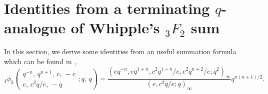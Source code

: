 \documentclass[reqno,12pt]{amsart}
\theoremstyle{remark}
\numberwithin{equation}{section}
\begin{document}
\section{Identities from a terminating $q$-analogue of Whipple's ${_3F_2}$ sum}
In this section,  we derive some identities from  an useful summation formula which can be found in \cite{Gasper_and_Rahman},
\begin{equation}\label{Whipple}
_4\phi_3\left(
\begin{array}{cccc}
q^{-n},\,q^{n+1},\,c,\,-c\\
e,\,c^2q/e,\,-q
\end{array};q,\,q\right)
=\frac{\left(eq^{-n},eq^{1+n},c^2q^{1-n}/e,c^2q^{n+2}/e;q^2\right)_{\infty}}
{\left(e,c^2q/e;q\right)_{\infty}}q^{n\left(n+1\right)/2}.
\end{equation}
\end{document}
